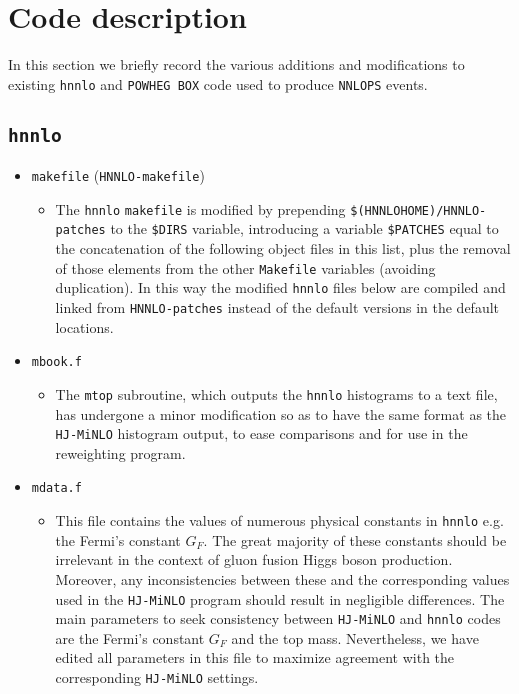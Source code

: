 \documentclass[11pt,a4paper]{article}
\newcommand{\noun}[1]{{\tt #1}}
\newcommand{\POWHEGBOX}{\noun{POWHEG BOX}}
\newcommand{\HJMINLO}{\noun{HJ-MiNLO}}
\newcommand{\HNNLO}{\noun{hnnlo}}
\newcommand{\NNLOPS}{\noun{NNLOPS}}
\begin{document}
\appendix


\section{Code description}
In this section we briefly record the various additions and modifications
to existing \HNNLO{} and \POWHEGBOX{} code used to produce \NNLOPS{} events.

\subsection{\HNNLO\label{sec:HNNLO-code}}
\begin{itemize}

\item {\tt{makefile}} ({\tt{HNNLO-makefile}})
  \begin{itemize}
  \item The \HNNLO{} {\tt{makefile}} is modified by
    prepending {\tt{\$(HNNLOHOME)/HNNLO-patches}} to
    the {\tt{\$DIRS}} variable, introducing a variable {\tt{\$PATCHES}}
    equal to the concatenation of the following object files in this list,
    plus the removal of those elements from the other {\tt{Makefile}}
    variables (avoiding duplication). In this way the modified \HNNLO{}
    files below are compiled and linked from {\tt{HNNLO-patches}} instead
    of the default versions in the default locations.
  \end{itemize}

\item {\tt{mbook.f}}
  \begin{itemize}
  \item The {\tt{mtop}} subroutine, which outputs the \HNNLO{} histograms
    to a text file, has undergone a minor modification so as to have the
    same format as the \HJMINLO{} histogram output, to ease comparisons
    and for use in the reweighting program.
  \end{itemize}

\item {\tt{mdata.f}}
  \begin{itemize}
  \item This file contains the values of numerous physical constants in
    \HNNLO{} e.g. the Fermi's constant $G_{F}$. The great majority of these
    constants should be irrelevant in the context of gluon fusion Higgs
    boson production. Moreover, any inconsistencies between these and
    the corresponding values used in the \HJMINLO{} program should result
    in negligible differences. The main parameters to 
    seek consistency between \HJMINLO{} and \HNNLO{} codes are the Fermi's
    constant $G_{F}$ and the top mass. Nevertheless, we have edited all
    parameters in this file to maximize agreement with the corresponding
    \HJMINLO{} settings.
  \end{itemize}


\end{itemize}
\end{document}
